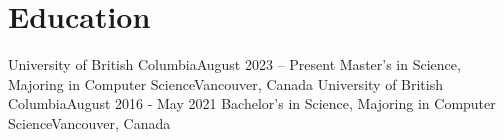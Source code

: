 \section{\textbf{Education}}%
\resumeSubHeadingListStart    
      \resumeSubheading
        {University of British Columbia}{August 2023 – Present}
        {Master's in Science, Majoring in Computer Science}{Vancouver, Canada}
        \resumeItemListStart
        \small{}
        \resumeItemListEnd
    \resumeSubheading
        {University of British Columbia}{August 2016 - May 2021}
        {Bachelor's in Science, Majoring in Computer Science}{Vancouver, Canada}
        \resumeItemListStart
        \small{}
        \resumeItemListEnd

\resumeSubHeadingListEnd